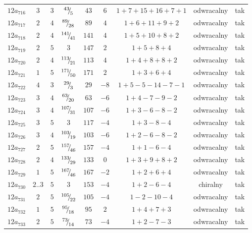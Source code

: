 \begin{longtable}{ccccccccc}
$12a_{716}$ & $3$ & $3$ & ${}^{43}{\mskip -5mu/\mskip -3mu}_{5}$ & $43$ & $6$ & $1+7+15+16+7+1$ & odwracalny & tak \\
$12a_{717}$ & $2$ & $4$ & ${}^{89}{\mskip -5mu/\mskip -3mu}_{28}$ & $89$ & $4$ & $1+6+11+9+2$ & odwracalny & tak \\
$12a_{718}$ & $2$ & $4$ & ${}^{141}{\mskip -5mu/\mskip -3mu}_{41}$ & $141$ & $4$ & $1+5+10+8+2$ & odwracalny & tak \\
$12a_{719}$ & $2$ & $5$ & $3$ & $147$ & $2$ & $1+5+8+4$ & odwracalny & tak \\
$12a_{720}$ & $2$ & $4$ & ${}^{113}{\mskip -5mu/\mskip -3mu}_{21}$ & $113$ & $4$ & $1+4+8+8+2$ & odwracalny & tak \\
$12a_{721}$ & $1$ & $5$ & ${}^{171}{\mskip -5mu/\mskip -3mu}_{50}$ & $171$ & $2$ & $1+3+6+4$ & odwracalny & tak \\
$12a_{722}$ & $4$ & $3$ & ${}^{29}{\mskip -5mu/\mskip -3mu}_{3}$ & $29$ & $-8$ & $1+5-5-14-7-1$ & odwracalny & tak \\
$12a_{723}$ & $3$ & $4$ & ${}^{63}{\mskip -5mu/\mskip -3mu}_{20}$ & $63$ & $-6$ & $1+4-7-9-2$ & odwracalny & tak \\
$12a_{724}$ & $3$ & $4$ & ${}^{107}{\mskip -5mu/\mskip -3mu}_{31}$ & $107$ & $-6$ & $1+3-6-8-2$ & odwracalny & tak \\
$12a_{725}$ & $3$ & $5$ & $3$ & $117$ & $-4$ & $1+3-8-4$ & odwracalny & tak \\
$12a_{726}$ & $3$ & $4$ & ${}^{103}{\mskip -5mu/\mskip -3mu}_{19}$ & $103$ & $-6$ & $1+2-6-8-2$ & odwracalny & tak \\
$12a_{727}$ & $2$ & $5$ & ${}^{157}{\mskip -5mu/\mskip -3mu}_{46}$ & $157$ & $-4$ & $1+1-6-4$ & odwracalny & tak \\
$12a_{728}$ & $2$ & $4$ & ${}^{133}{\mskip -5mu/\mskip -3mu}_{29}$ & $133$ & $0$ & $1+3+9+8+2$ & odwracalny & tak \\
$12a_{729}$ & $1$ & $5$ & ${}^{167}{\mskip -5mu/\mskip -3mu}_{46}$ & $167$ & $-2$ & $1+2+6+4$ & odwracalny & tak \\
$12a_{730}$ & $2..3$ & $5$ & $3$ & $153$ & $-4$ & $1+2-6-4$ & chiralny & tak \\
$12a_{731}$ & $2$ & $5$ & ${}^{105}{\mskip -5mu/\mskip -3mu}_{22}$ & $105$ & $-4$ & $1-2-10-4$ & odwracalny & tak \\
$12a_{732}$ & $1$ & $5$ & ${}^{95}{\mskip -5mu/\mskip -3mu}_{18}$ & $95$ & $2$ & $1+4+7+3$ & odwracalny & tak \\
$12a_{733}$ & $2$ & $5$ & ${}^{73}{\mskip -5mu/\mskip -3mu}_{14}$ & $73$ & $-4$ & $1+2-7-3$ & odwracalny & tak \\

\end{longtable}
